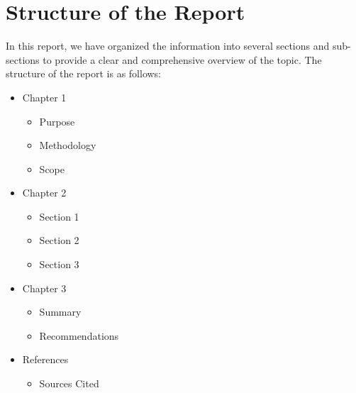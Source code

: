 \section{Structure of the Report}

In this report, we have organized the information into several sections and sub-sections to provide a clear and comprehensive overview of the topic. The structure of the report is as follows:

\begin{itemize}
\item Chapter 1
  \begin{itemize}
  \item Purpose
  \item Methodology
  \item Scope
  \end{itemize}
\item Chapter 2
  \begin{itemize}
  \item Section 1
  \item Section 2
  \item Section 3
  \end{itemize}
\item Chapter 3
  \begin{itemize}
  \item Summary
  \item Recommendations
  \end{itemize}
\item References
  \begin{itemize}
  \item Sources Cited
  \end{itemize}
\end{itemize}